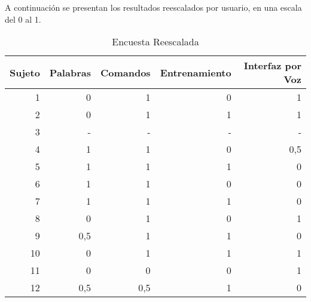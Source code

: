 A continuaci\'on se presentan los resultados reescalados por usuario, en una escala del 0 al 1.


\begin{table}[H] 
\centering
\footnotesize
\begin{tabular}{|r|r|r|r|r|}
\hline
    Sujeto &  Palabras & Comandos & Entrenamiento & Interfaz por Voz \\
    \hline
1 &  0 & 1 & 0 & 1\\
2 &  0 & 1 & 1 & 1\\
3 &  - & - & - & -\\
4 &  1 & 1 & 0 & 0,5\\
5 &  1 & 1 & 1 & 0\\
6 &  1 & 1 & 0 & 0\\
7 &  1 & 1 & 1 & 0\\
8 &  0 & 1 & 0 & 1\\
9 &  0,5 & 1 & 1 & 0\\
10 & 0 & 1 & 1 & 1\\
11 & 0 & 0 & 0 & 1\\
12 & 0,5 & 0,5 & 1 & 0\\
\hline
\end{tabular}
\caption{Encuesta Reescalada}
\label{sec:tabla-encuesta-normalizada}
\end{table}

